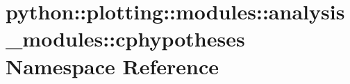 \hypertarget{namespacepython_1_1plotting_1_1modules_1_1analysis__modules_1_1cphypotheses}{
\section{python::plotting::modules::analysis\_\-modules::cphypotheses Namespace Reference}
\label{namespacepython_1_1plotting_1_1modules_1_1analysis__modules_1_1cphypotheses}
}
